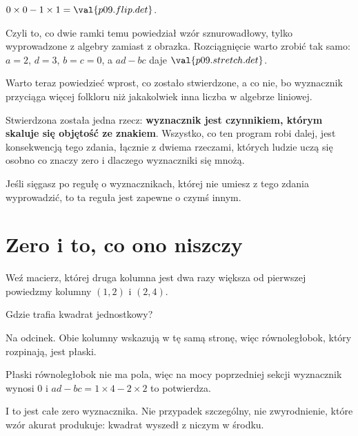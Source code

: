 \begin{fr}
\begin{ansblock}
$0 \times 0 - 1 \times 1 = \val{p09.flip.det}$.
\end{ansblock}

Czyli to, co dwie ramki temu powiedział wzór sznurowadłowy, tylko wyprowadzone
z algebry zamiast z obrazka. Rozciągnięcie warto zrobić tak samo: $a = 2$,
$d = 3$, $b = c = 0$, a $ad - bc$ daje $\val{p09.stretch.det}$.

Warto teraz powiedzieć wprost, co zostało stwierdzone, a co nie, bo wyznacznik
przyciąga więcej folkloru niż jakakolwiek inna liczba w algebrze liniowej.

Stwierdzona została jedna rzecz: \textbf{wyznacznik jest czynnikiem, którym
skaluje się objętość ze znakiem}. Wszystko, co ten program robi dalej, jest
konsekwencją tego zdania, łącznie z dwiema rzeczami, których ludzie uczą się
osobno \dash{} co znaczy zero i dlaczego wyznaczniki się mnożą.

Jeśli sięgasz po regułę o wyznacznikach, której nie umiesz z tego zdania
wyprowadzić, to ta reguła jest zapewne o czymś innym.
\end{fr}

\section{Zero i to, co ono niszczy}
\label{sec:P09-zero}

\begin{fr}
Weź macierz, której druga kolumna jest dwa razy większa od pierwszej \dash{}
powiedzmy kolumny $(1, 2)$ i $(2, 4)$.

Gdzie trafia kwadrat jednostkowy?
\dotline
\nextframe
\end{fr}

\begin{fr}
\begin{ansblock}
Na odcinek. Obie kolumny wskazują w tę samą stronę, więc równoległobok, który
rozpinają, jest płaski.
\end{ansblock}

Płaski równoległobok nie ma pola, więc na mocy poprzedniej sekcji wyznacznik
wynosi $0$ \dash{} i $ad - bc = 1 \times 4 - 2 \times 2$ to potwierdza.

I to jest całe zero wyznacznika. Nie przypadek szczególny, nie zwyrodnienie,
które wzór akurat produkuje: kwadrat wyszedł z niczym w środku.
\end{fr}

